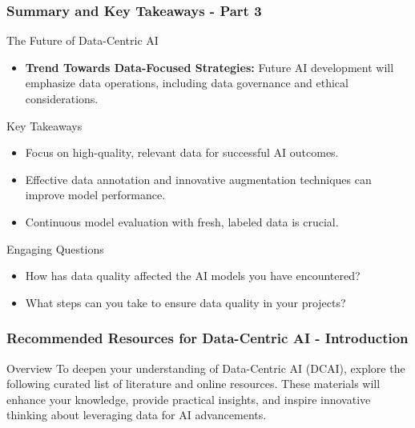 \documentclass[aspectratio=169]{beamer}
\begin{document}
\begin{frame}[fragile]
    \frametitle{Summary and Key Takeaways - Part 3}
    \begin{block}{The Future of Data-Centric AI}
        \begin{itemize}
            \item \textbf{Trend Towards Data-Focused Strategies:} Future AI development will emphasize data operations, including data governance and ethical considerations.
        \end{itemize}
    \end{block}
    
    \begin{block}{Key Takeaways}
        \begin{itemize}
            \item Focus on high-quality, relevant data for successful AI outcomes.
            \item Effective data annotation and innovative augmentation techniques can improve model performance.
            \item Continuous model evaluation with fresh, labeled data is crucial.
        \end{itemize}
    \end{block}
    
    \begin{block}{Engaging Questions}
        \begin{itemize}
            \item How has data quality affected the AI models you have encountered?
            \item What steps can you take to ensure data quality in your projects?
        \end{itemize}
    \end{block}
\end{frame}

\begin{frame}[fragile]
    \frametitle{Recommended Resources for Data-Centric AI - Introduction}
    \begin{block}{Overview}
        To deepen your understanding of Data-Centric AI (DCAI), explore the following curated list of literature and online resources. 
        These materials will enhance your knowledge, provide practical insights, and inspire innovative thinking about leveraging data for AI advancements.
    \end{block}
\end{frame}
\end{document}
